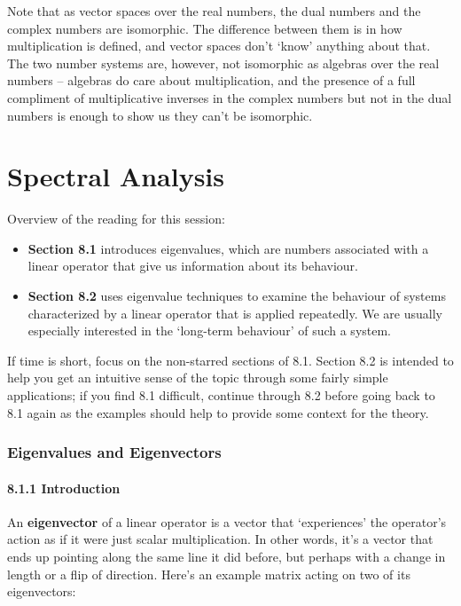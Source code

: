 \documentclass[oneside,english]{amsbook}
\numberwithin{section}{chapter}
\theoremstyle{plain}
\theoremstyle{definition}
\begin{document}
Note that as vector spaces over the real numbers, the dual numbers and
the complex numbers are isomorphic. The difference between them is in
how multiplication is defined, and vector spaces don't `know' anything
about that. The two number systems are, however, not isomorphic as
algebras over the real numbers -- algebras do care about multiplication,
and the presence of a full compliment of multiplicative inverses in the
complex numbers but not in the dual numbers is enough to show us they
can't be isomorphic.

\chapter{Spectral Analysis}

Overview of the reading for this session:

\begin{itemize}
	\item
	\textbf{Section 8.1} introduces eigenvalues, which are numbers
	associated with a linear operator that give us information about its
	behaviour.
	\item
	\textbf{Section 8.2} uses eigenvalue techniques to examine the
	behaviour of systems characterized by a linear operator that is
	applied repeatedly. We are usually especially interested in the
	`long-term behaviour' of such a system.
\end{itemize}

If time is short, focus on the non-starred sections of 8.1. Section 8.2
is intended to help you get an intuitive sense of the topic through some
fairly simple applications; if you find 8.1 difficult, continue through
8.2 before going back to 8.1 again as the examples should help to
provide some context for the theory.

\subsection{Eigenvalues and Eigenvectors}

\subsubsection{8.1.1 Introduction}\label{introduction-1}

An \textbf{eigenvector} of a linear operator is a vector that
`experiences' the operator's action as if it were just scalar
multiplication. In other words, it's a vector that ends up pointing
along the same line it did before, but perhaps with a change in length
or a flip of direction. Here's an example matrix acting on two of its
eigenvectors:
\end{document}
